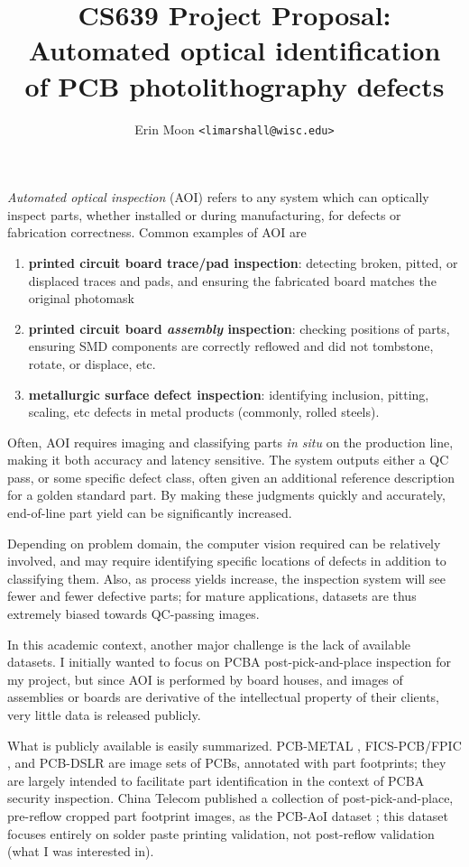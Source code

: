 \documentclass{article}
\title{{\Large CS639 Project Proposal:}\\Automated optical identification\\of PCB photolithography defects}
\author{Erin Moon \texttt{<limarshall@wisc.edu>}}
\begin{document}
\maketitle

\emph{Automated optical inspection} (AOI) refers to any system which can optically inspect parts, whether installed or during manufacturing, for defects or fabrication correctness. Common examples of AOI are
\begin{enumerate}
    \item \textbf{printed circuit board trace/pad inspection}: detecting broken, pitted, or displaced traces and pads, and ensuring the fabricated board matches the original photomask
    \item \textbf{printed circuit board \emph{assembly} inspection}: checking positions of parts, ensuring SMD components are correctly reflowed and did not tombstone, rotate, or displace, etc.
    \item \textbf{metallurgic surface defect inspection}: identifying inclusion, pitting, scaling, etc defects in metal products (commonly, rolled steels).
\end{enumerate}

Often, AOI requires imaging and classifying parts \emph{in situ} on the production line, making it both accuracy and latency sensitive. The system outputs either a QC pass, or some specific defect class, often given an additional reference description for a golden standard part. By making these judgments quickly and accurately, end-of-line part yield can be significantly increased.

Depending on problem domain, the computer vision required can be relatively involved, and may require identifying specific locations of defects in addition to classifying them.
Also, as process yields increase, the inspection system will see fewer and fewer defective parts; for mature applications, datasets are thus extremely biased towards QC-passing images.

In this academic context, another major challenge is the lack of available datasets. I initially wanted to focus on PCBA post-pick-and-place inspection for my project, but since AOI is performed by board houses, and images of assemblies or boards are derivative of the intellectual property of their clients, very little data is released publicly.

What is publicly available is easily summarized. PCB-METAL \cite{pcb-metal}, FICS-PCB/FPIC \cite{jessurun2022fpic,lu2020fics}, and PCB-DSLR \cite{pramerdorfer2015} are image sets of PCBs, annotated with part footprints; they are largely intended to facilitate part identification in the context of PCBA security inspection. China Telecom published a collection of post-pick-and-place, pre-reflow cropped part footprint images, as the PCB-AoI dataset \cite{pcb-aoi}; this dataset focuses entirely on solder paste printing validation, not post-reflow validation (what I was interested in).
\end{document}
